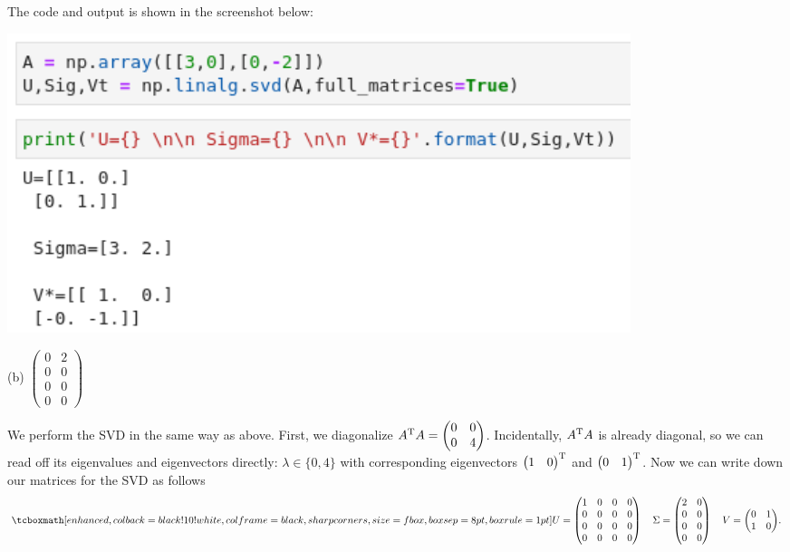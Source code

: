 The code and output is shown in the screenshot below:
\begin{center}
    \includegraphics[width=0.8\textwidth]{prob6-a.png}
\end{center}


(b) $
\begin{pmatrix}
    0 & 2 \\
    0 & 0 \\
    0 & 0 \\
    0 & 0
\end{pmatrix}
$

We perform the SVD in the same way as above.
First, we diagonalize $A^{\rm T}A = \begin{pmatrix}0 & 0 \\ 0 & 4\end{pmatrix}$.
Incidentally, $A^{\rm T}A$ is already diagonal, so we can read off its eigenvalues and eigenvectors directly: $\lambda \in \{ 0,4 \} $ with corresponding eigenvectors $\begin{pmatrix}1 & 0\end{pmatrix}^{\rm T}$ and $\begin{pmatrix}0 & 1\end{pmatrix}^{\rm T}$.
Now we can write down our matrices for the SVD as follows
\begin{eqnarray}
    \label{eq:SVD-matrices}
    \eqbox{
    U = 
    \begin{pmatrix}
        1 & 0 & 0 & 0 \\
        0 & 0 & 0 & 0 \\
        0 & 0 & 0 & 0 \\
        0 & 0 & 0 & 0 
    \end{pmatrix}
    \quad
    \Sigma = 
    \begin{pmatrix}
        2 & 0 \\
        0 & 0 \\
        0 & 0 \\
        0 & 0 
    \end{pmatrix}
    \quad
    V = 
    \begin{pmatrix}
        0 & 1 \\
        1 & 0
    \end{pmatrix}
    }
.\end{eqnarray}

